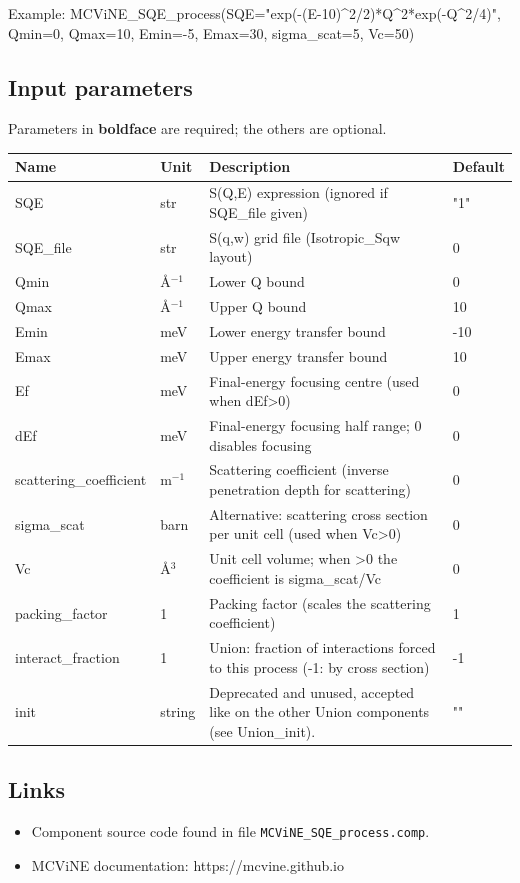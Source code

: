 Example: MCViNE\_SQE\_process(SQE="exp(-(E-10)\textasciicircum{}2/2)*Q\textasciicircum{}2*exp(-Q\textasciicircum{}2/4)", Qmin=0, Qmax=10, Emin=-5, Emax=30, sigma\_scat=5, Vc=50)

\subsection*{Input parameters}
Parameters in \textbf{boldface} are required; the others are optional.

\begin{longtable}{p{}p{}p{}p{}}
\toprule
\textbf{Name} & \textbf{Unit} & \textbf{Description} & \textbf{Default} \\
\midrule
\endhead
SQE & str & S(Q,E) expression (ignored if SQE\_file given) & "1" \\
SQE\_file & str & S(q,w) grid file (Isotropic\_Sqw layout) & 0 \\
Qmin & \AA{}$^{-1}$ & Lower Q bound & 0 \\
Qmax & \AA{}$^{-1}$ & Upper Q bound & 10 \\
Emin & meV & Lower energy transfer bound & -10 \\
Emax & meV & Upper energy transfer bound & 10 \\
Ef & meV & Final-energy focusing centre (used when dEf\textgreater{}0) & 0 \\
dEf & meV & Final-energy focusing half range; 0 disables focusing & 0 \\
scattering\_coefficient & m$^{-1}$ & Scattering coefficient (inverse penetration depth for scattering) & 0 \\
sigma\_scat & barn & Alternative: scattering cross section per unit cell (used when Vc\textgreater{}0) & 0 \\
Vc & \AA{}$^{3}$ & Unit cell volume; when \textgreater{}0 the coefficient is sigma\_scat/Vc & 0 \\
packing\_factor & 1 & Packing factor (scales the scattering coefficient) & 1 \\
interact\_fraction & 1 & Union: fraction of interactions forced to this process (-1: by cross section) & -1 \\
init & string & Deprecated and unused, accepted like on the other Union components (see Union\_init). & "" \\
\bottomrule
\end{longtable}

\subsection*{Links}
\begin{itemize}
  \item Component source code found in file \texttt{MCViNE\_SQE\_process.comp}.
  \item MCViNE documentation: https://mcvine.github.io
\end{itemize}
